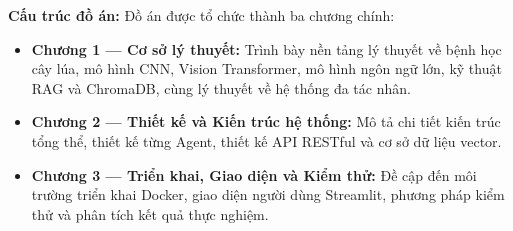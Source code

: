 \documentclass{uetgraduation}
\begin{document}
\textbf{Cấu trúc đồ án:}
Đồ án được tổ chức thành ba chương chính:

\begin{itemize}[leftmargin=1.5cm]
    \item \textbf{Chương 1 --- Cơ sở lý thuyết:} Trình bày nền tảng lý thuyết về bệnh học cây lúa, mô hình CNN, Vision Transformer, mô hình ngôn ngữ lớn, kỹ thuật RAG và ChromaDB, cùng lý thuyết về hệ thống đa tác nhân.
    \item \textbf{Chương 2 --- Thiết kế và Kiến trúc hệ thống:} Mô tả chi tiết kiến trúc tổng thể, thiết kế từng Agent, thiết kế API RESTful và cơ sở dữ liệu vector.
    \item \textbf{Chương 3 --- Triển khai, Giao diện và Kiểm thử:} Đề cập đến môi trường triển khai Docker, giao diện người dùng Streamlit, phương pháp kiểm thử và phân tích kết quả thực nghiệm.
\end{itemize}
\clearpage






\end{document}
